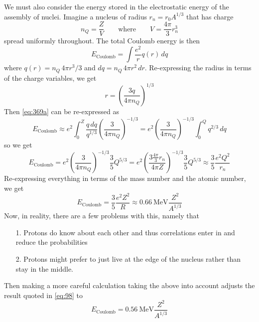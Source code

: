\documentclass[10pt]{article}
\numberwithin{equation}{section}
\newcommand{\n}{\noindent}
\begin{document}
  \n We must also consider the energy stored in the electrostatic
  energy of the assembly of nuclei. Imagine a nucleus of radius
  $r_n=r_0A^{1/3}$ that has charge
  \begin{equation}
    \label{eq:368}
    n_Q=\frac{Z}{V}\qquad\textrm{where}\qquad V=\frac{4\pi}{3}r_n^3
  \end{equation}
  spread uniformly throughout. The total Coulomb energy is then
  \begin{equation}
    \label{eq:369a}
    E_{\mathrm{Coulomb}}=\int \frac{e^2}{r}q(r)\,dq
  \end{equation}
  where $q(r)=n_Q\, 4\pi r^3/3$ and $dq=n_Q\,4\pi
  r^2\,dr$. Re-expressing the radius in terms of the charge variables,
  we get
  \begin{equation}
    \label{eq:370}
    r=\left(\frac{3q}{4\pi n_Q}\right)^{1/3}
  \end{equation}
  Then \eqref{eq:369a} can be re-expressed as
  \begin{equation}
    \label{eq:371}
    E_{\mathrm{Coulomb}}\approx
      e^2\int_0^Z\frac{q\,dq}{q^{1/3}}\left(\frac{3}{4\pi
          n_Q}\right)^{-1/3}=e^2\left(\frac{3}{4\pi
          n_Q}\right)^{-1/3}\int_0^Q q^{2/3}\,dq
  \end{equation}
  so we get
  \begin{equation}
    \label{eq:372}
    E_{\mathrm{Coulomb}}=e^2\left(\frac{3}{4\pi
        n_Q}\right)^{-1/3}\frac{3}{5}Q^{5/3}=e^2\left(\frac{3\frac{4\pi}{3}r_n}{4\pi
        Z}\right)^{-1/3}\frac{3}{5}Q^{5/3}\approx \frac{3}{5}\frac{e^2Q^2}{r_n}
  \end{equation}
  Re-expressing everything in terms of the mass number and the atomic
  number, we get
  \begin{equation}
    \label{eq:98}
    E_{\mathrm{Coulomb}}=\frac{3}{5}\frac{e^2
      Z^2}{R}\approx 0.66\ \mathrm{MeV}\frac{Z^2}{A^{1/3}}
  \end{equation}
  Now, in reality, there are a few problems with this, namely that
  \begin{enumerate}
  \item[1.] Protons do know about each other and thus correlations
    enter in and reduce the probabilities
  \item[2.] Protons might prefer to just live at the edge of the
    nucleus rather than stay in the middle.
  \end{enumerate}
  Then making a more careful calculation taking the above into account
  adjusts the result quoted in \eqref{eq:98} to
  \begin{equation}
    \label{eq:373}
    E_{\mathrm{Coulomb}}=0.56\ \mathrm{MeV}\frac{Z^2}{A^{1/3}}
  \end{equation}
\end{document}
